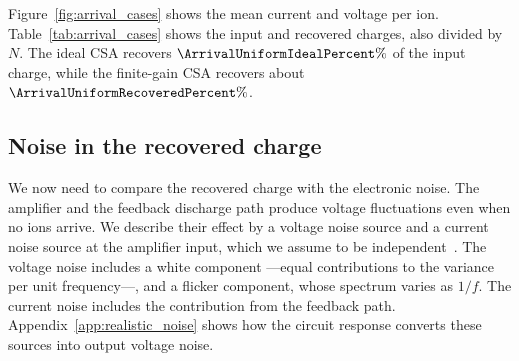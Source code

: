 Figure~\ref{fig:arrival_cases} shows the mean current and voltage per ion. Table~\ref{tab:arrival_cases} shows the input and recovered charges, also divided by $N$. The ideal CSA recovers $\ArrivalUniformIdealPercent\%$ of the input charge, while the finite-gain CSA recovers about $\ArrivalUniformRecoveredPercent\%$.

\begin{table}[!htbp]
 \centering
 
 \caption{Input and recovered charge per ion, in units of $e$, for uniform arrivals. Voltages are read at the boundaries of the \SI{\ArrivalFrameMs}{ms} frame.}
 \label{tab:arrival_cases}
\end{table}

\subsection{Noise in the recovered charge}
\label{sec:charge_noise}

We now need to compare the recovered charge with the electronic noise. The amplifier and the feedback discharge path produce voltage fluctuations even when no ions arrive. We describe their effect by a voltage noise source and a current noise source at the amplifier input, which we assume to be independent~\cite{tiNoise2007,spielerNoise1998}. The voltage noise includes a white component ---equal contributions to the variance per unit frequency---, and a flicker component, whose spectrum varies as $1/f$. The current noise includes the contribution from the feedback path. Appendix~\ref{app:realistic_noise} shows how the circuit response converts these sources into output voltage noise.

